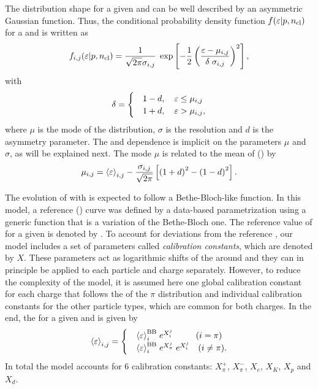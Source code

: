 The \eps distribution shape for a given \ncl and \pp
can be well described by an asymmetric Gaussian function.
Thus, the conditional probability density function $f(\mbox{$\varepsilon$}|p,\mbox{$n_{\text{cl}}$})$ for a 
\ipart and \ich is written as
\begin{equation}
  f_{i,j}(\mbox{$\varepsilon$}|p,\mbox{$n_{\text{cl}}$}) = \frac{1}{\sqrt{2\pi}\sigma_{i,j}} \;
  \exp\left[-\frac{1}{2}\left(\frac{\mbox{$\varepsilon$}-\mu_{i,j}}{\delta \; \sigma_{i,j}}\right)^2\right],
  \label{eq:hadron:dedx:model:pdf}
\end{equation}
with
\begin{equation}
  \delta =
  \begin{cases}
    & 1-d, \ \ \ \mbox{$\varepsilon$} \le \mu_{i,j} \\
    & 1+d, \ \ \ \mbox{$\varepsilon$} > \mu_{i,j}, \\
  \end{cases}
  \label{eq:hadron:dedx:model:asymm}
\end{equation}
where $\mu$ is the mode of the distribution, $\sigma$ is the resolution
and $d$ is the asymmetry parameter. The \pp and \ncl dependence is implicit
on the parameters $\mu$ and $\sigma$, as will be explained next.
The mode $\mu$ is related to the mean of \eps (\meaneps) by
\begin{equation}
  \mu_{i,j} = \mbox{$\langle\varepsilon\rangle$}_{i,j} - \frac{\sigma_{i,j}}{\sqrt{2\pi}}
  \left[\left(1+d\right)^2 - \left(1-d\right)^2 \right].
  \label{eq:hadron:dedx:model:mu}
\end{equation}

The evolution of \meaneps with \pp is expected to follow
a Bethe-Bloch-like function. In this model, a reference
\meaneps(\pp) curve was defined by a data-based
parametrization using a generic function that is a
variation of the Bethe-Bloch one. The reference value
of \meaneps for a given \pp is denoted by \meanepsbb.
To account for deviations from the reference \meaneps,
our model includes a set of parameters called
\textit{calibration constants}, which are denoted by $X$.
These parameters act as logarithmic shifts of the \meaneps
around \meanepsbb and they can in principle be applied
to each particle and charge separately. However, to reduce the complexity
of the model, it is assumed here one global calibration constant
for each charge that follows the \meaneps of the $\pi$ distribution
and individual calibration constants for the other particle types,
which are common for both charges. In the end, the \meaneps for a
given \ipart and \ich is given by
\begin{equation}
  \meaneps_{\ipart,\ich} =
  \begin{cases}
    & \meaneps_{\ipart}^\text{BB} \; e^{X_{\ipart}^{\ich}} \ \ \ \ \ \ \ \ (i=\pi) \\
    & \meaneps_{\ipart}^\text{BB} \; e^{X_{\pi}^{\ich}} \; e^{X_{\ipart}^{\ich}} \ \ \ (i\neq\pi).
  \end{cases}
  \label{eq:hadron:dedx:model:cal}
\end{equation}
In total the model accounts for 6 calibration constants:
$X_{\pi}^{+}$, $X_{\pi}^{-}$, $X_{e}$, $X_{K}$, $X_{p}$ and $X_{d}$.

